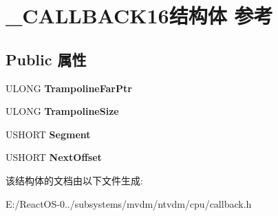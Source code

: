 \hypertarget{struct___c_a_l_l_b_a_c_k16}{}\section{\+\_\+\+C\+A\+L\+L\+B\+A\+C\+K16结构体 参考}
\label{struct___c_a_l_l_b_a_c_k16}
\subsection*{Public 属性}
\begin{DoxyCompactItemize}
\item 
\mbox{\label{struct___c_a_l_l_b_a_c_k16_a0404f0011aef1323034d9aa516e26fcc}} 
U\+L\+O\+NG {\bfseries Trampoline\+Far\+Ptr}
\item 
\mbox{\label{struct___c_a_l_l_b_a_c_k16_a8cca058a7b866b09616c869e269d4c56}} 
U\+L\+O\+NG {\bfseries Trampoline\+Size}
\item 
\mbox{\label{struct___c_a_l_l_b_a_c_k16_a7fd6de8c4caa45c6183bf0a1111da2bc}} 
U\+S\+H\+O\+RT {\bfseries Segment}
\item 
\mbox{\label{struct___c_a_l_l_b_a_c_k16_af97a50fbb3e012fcb475feec73dd6645}} 
U\+S\+H\+O\+RT {\bfseries Next\+Offset}
\end{DoxyCompactItemize}


该结构体的文档由以下文件生成\+:\begin{DoxyCompactItemize}
\item 
E\+:/\+React\+O\+S-\/0../subsystems/mvdm/ntvdm/cpu/callback.\+h\end{DoxyCompactItemize}
